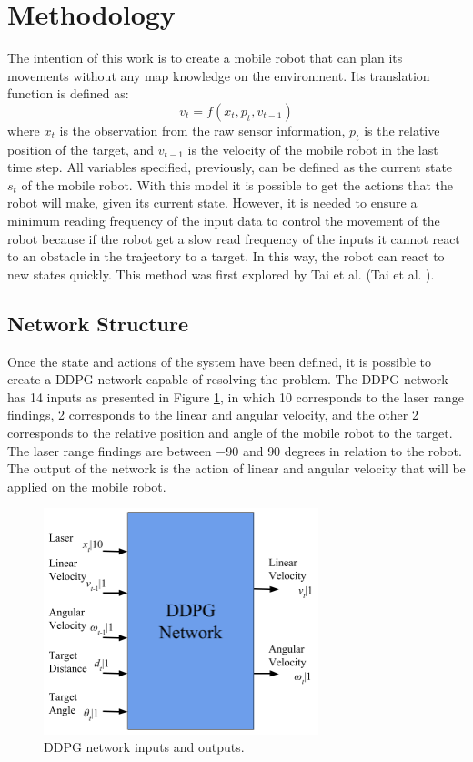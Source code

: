 \section*{Methodology}

The intention of this work is to create a mobile robot that can plan its movements without any map knowledge on the environment. Its translation function is defined as:
\begin{equation}
v_t = f(x_t, p_t, v_{t-1})
\end{equation}
where $x_t$ is the observation from the raw sensor information, $p_t$ is the relative position of the target, and $v_{t-1}$ is the velocity of the mobile robot in the last time step.
All variables specified, previously, can be defined as the current state $s_t$ of the mobile robot.
With this model it is possible to get the actions that the robot will make, given its current state.
However, it is needed to ensure a minimum reading frequency of the input data to control the movement of the robot because if the robot get a slow read frequency of the inputs it cannot react to an obstacle in the trajectory to a target. In this way, the robot can react to new states quickly.
This method was first explored by Tai et al. (Tai et al. \citeyear{tai2017virtual}).

\subsection*{Network Structure}

Once the state and actions of the system have been defined, it is possible to create a DDPG network capable of resolving the problem.
The DDPG network has 14 inputs as presented in {\color{blue}Figure} \ref{fig:entradaESaida}, in which 10 corresponds to the laser range findings, 2 corresponds to the linear and angular velocity, and the other 2 corresponds to the relative position and angle of the mobile robot to the target.
The laser range findings are between $-90$ and $90$ degrees in relation to the robot. The output of the network is the action of linear and angular velocity that will be applied on the mobile robot.

\begin{figure}[H]
\centerline{\includegraphics[width=8cm]{images/o_and_i.png}}
\caption{DDPG network inputs and outputs.}
\label{fig:entradaESaida}
\end{figure}

